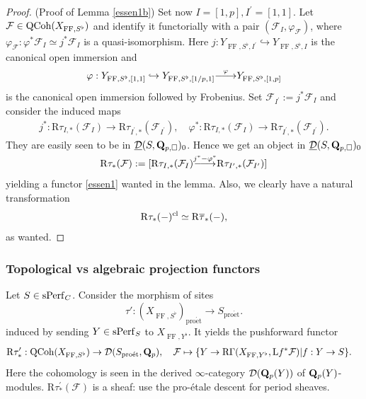\documentclass[10pt]{amsart}
\theoremstyle{definition}
\theoremstyle{remark}
\def\lomapr#1{\smash{\mathop{\relbar\joinrel\longrightarrow}\limits^{#1}}}
\def\phi{\varphi}
\newcommand{\proeet}{\operatorname{pro\acute{e}t} }
\newcommand{\LL}{\operatorname{L} }
\newcommand{\FF}{\operatorname{FF} }
\newcommand{\sff}{{\mathcal{F}}}
\newcommand{\sd}{{\mathcal{D}}}
\numberwithin{equation}{section}
\def\R{{\mathrm R}}
\def\Q{{\bf Q}} \def\Z{{\bf Z}}
\numberwithin{equation}{section}
\begin{document}
\begin{proof}{\rm(Proof of Lemma \ref{essen1b})}
   Set now $I=[1,p], I^{\prime}=[1,1]$.  Let $\sff\in {\rm QCoh}(X_{\FF,S^{\flat}})$ and identify it functorially with a pair $(\sff_I,\phi_\sff)$, where $\phi_\sff:\phi^*\sff_I\simeq j^*\sff_I$ is a quasi-isomorphism. Here $j: Y_{\FF,S^{\flat},I^{\prime}}\hookrightarrow Y_{\FF,S^{\flat},I}$ is the canonical open immersion and 
  $$\phi: Y_{\FF,S^{\flat},[1,1]}\hookrightarrow Y_{\FF,S^{\flat},[1/p,1]}  \lomapr{\phi} Y_{\FF,S^{\flat},[1,p]}$$ is  the canonical open immersion followed by Frobenius. Set $\sff_{I^{\prime}}:=j^*\sff_I$ and consider   the induced maps 
\begin{align*}
j^*:  \R\tau_{I,*}(\sff_I)\to  \R\tau_{I^{\prime},*}(\sff_{I^{\prime}}),\quad  \phi^*: \R\tau_{I,*}(\sff_I)\to  \R\tau_{I^{\prime},*}(\sff_{I^{\prime}}).
\end{align*}
They are easily seen to be in $\underline{\sd}(S,\Q_{p,\Box})_0$. 
 Hence we get an object in $\underline{\sd}(S,\Q_{p,\Box})_0$
\begin{equation}\label{cone1}
 \R\tau_{*}(\sff):=[ \R\tau_{I,*}(\sff_I)\lomapr{j^*-\phi^*} \R\tau_{I^{\prime},*}(\sff_{I^{\prime}})]
\end{equation}
 yielding a functor \eqref{essen1} wanted in the lemma.
Also, we clearly have a natural transformation
$$
 \R\tau_{*}(-)^{\rm cl}\simeq  \R\overline{\tau}_{*}(-),
$$
as wanted. 
 \end{proof}
\subsubsection{Topological vs algebraic projection functors}
    Let $S\in {\rm sPerf}_C$. Consider the morphism of sites
$$
\tau': (X_{\FF, S^{\flat}})_{\proeet}\to S_{\proeet}. 
$$   
induced by sending $Y\in {\rm sPerf}_{S}$ to $X_{\FF,Y^{\flat}}$. 
 It yields the pushforward functor
\begin{align}\label{simons1}
& \R\tau^{\prime}_*: {\rm QCoh}(X_{\FF,S^{\flat}})\to \sd(S_{\proeet},{\Q}_p),\quad \sff\mapsto \{Y\to \R\Gamma(X_{\FF,Y^{\flat}},{\LL}f^*\sff)| f:Y\to S\}.
\end{align}
Here the  cohomology is seen in the derived $\infty$-category $\sd(\Q_{p}(Y))$  of $\Q_{p}(Y)$-modules.
 $ \R\tau^{\prime}_*(\sff)$ is a sheaf:  use the pro-\'etale descent for period sheaves.
\end{document}
